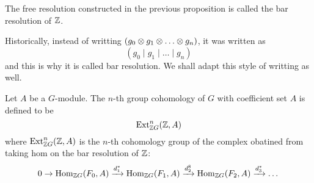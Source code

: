 \begin{defn} 
    The free resolution constructed in the previous proposition is called the bar resolution of ${\mathbb Z}$.
\end{defn}

\medskip

\begin{re}
    Historically, instead of writting $(g_0 \ten g_1 \ten \dots \ten g_n)$, it was written as 
    \[(g_0 \mid g_1 \mid \dots \mid g_n)\]
    and this is why it is called bar resolution. We shall adapt this style of writting as well.
\end{re}

\medskip

\begin{defn} 
    Let $A$ be a $G$-module. The $n$-th group cohomology of $G$ with coefficient set $A$ is defined to be
    \[\operatorname{Ext}_{{\mathbb Z} G}^n ({\mathbb Z}, A)\]
    where $\operatorname{Ext}_{{\mathbb Z} G}^n ({\mathbb Z}, A)$ is the $n$-th cohomology group of the complex obatined from taking hom on the bar resolution of ${\mathbb Z}$:
    \[0 \to \operatorname{Hom}_{{\mathbb Z} G}(F_0, A) \xrightarrow{d_1^*} \operatorname{Hom}_{{\mathbb Z} G}(F_1, A) \xrightarrow{d_2^8} \operatorname{Hom}_{{\mathbb Z} G}(F_2, A) \xrightarrow{d_3^*}\dots\]
\end{defn}